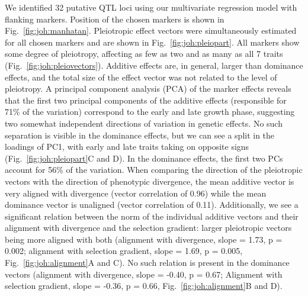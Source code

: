 \begin{refsection}
We identified 32 putative QTL loci using our multivariate regression
model with flanking markers. Position of the chosen markers is shown in
Fig.~\ref{fig:joh:manhatan}. Pleiotropic effect vectors were simultaneously estimated for
all chosen markers and are shown in Fig.~\ref{fig:joh:pleiopart}. All markers show some
degree of pleiotropy, affecting as few as two and as many as all 7
traits (Fig.~\ref{fig:joh:pleiovectors}). Additive effects are, in general, larger than
dominance effects, and the total size of the effect vector was not
related to the level of pleiotropy. A principal component analysis (PCA) of
the marker effects reveals that the first two principal components of
the additive effects (responsible for 71\% of the variation) correspond
to the early and late growth phase, suggesting two somewhat independent
directions of variation in genetic effects. No such separation is
visible in the dominance effects, but we can see a split in the loadings
of PC1, with early and late traits taking on opposite signs (Fig.~\ref{fig:joh:pleiopart}C and
D). In the dominance effects, the first two PCs account for 56\% of the
variation. When comparing the direction of the pleiotropic vectors with
the direction of phenotypic divergence, the mean additive vector is very
aligned with divergence (vector correlation of 0.96) while the mean
dominance vector is unaligned (vector correlation of 0.11).
Additionally, we see a significant relation between the norm of the
individual additive vectors and their alignment with divergence and the
selection gradient: larger pleiotropic vectors being more aligned with
both (alignment with divergence, slope = 1.73, p = 0.002; alignment with
selection gradient, slope = 1.69, p = 0.005, Fig.~\ref{fig:joh:alignment}A and C). No such
relation is present in the dominance vectors (alignment with divergence,
slope = -0.40, p = 0.67; Alignment with selection gradient, slope =
-0.36, p = 0.66, Fig.~\ref{fig:joh:alignment}B and D).


\end{refsection}
